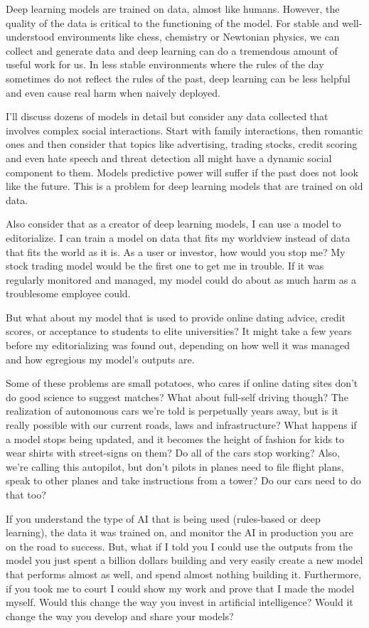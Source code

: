 Deep learning models are trained on data, almost like humans. However, the quality of the data is critical to the functioning of the model. For stable and well-understood environments like chess, chemistry or Newtonian physics, we can collect and generate data and deep learning can do a tremendous amount of useful work for us. In less stable environments where the rules of the day sometimes do not reflect the rules of the past, deep learning can be less helpful and even cause real harm when naively deployed. 

I'll discuss dozens of models in detail but consider any data collected that involves complex social interactions. Start with family interactions, then romantic ones and then consider that topics like advertising, trading stocks, credit scoring and even hate speech and threat detection all might have a dynamic social component to them. Models predictive power will suffer if the past does not look like the future. This is a problem for deep learning models that are trained on old data.

Also consider that as a creator of deep learning models, I can use a model to editorialize. I can train a model on data that fits my worldview instead of data that fits the world as it is. As a user or investor, how would you stop me? My stock trading model would be the first one to get me in trouble. If it was regularly monitored and managed, my model could do about as much harm as a troublesome employee could. 

But what about my model that is used to provide online dating advice, credit scores, or acceptance to students to elite universities? It might take a few years before my editorializing was found out, depending on how well it was managed and how egregious my model's outputs are.

Some of these problems are small potatoes, who cares if online dating sites don't do good science to suggest matches? What about full-self driving though? The realization of autonomous cars we're told is perpetually years away, but is it really possible with our current roads, laws and infrastructure? What happens if a model stops being updated, and it becomes the height of fashion for kids to wear shirts with street-signs on them? Do all of the cars stop working? Also, we're calling this autopilot, but don't pilots in planes need to file flight plans, speak to other planes and take instructions from a tower? Do our cars need to do that too? 

If you understand the type of AI that is being used (rules-based or deep learning), the data it was trained on, and monitor the AI in production you are on the road to success. But, what if I told you I could use the outputs from the model you just spent a billion dollars building and very easily create a new model that performs almost as well, and spend almost nothing building it. Furthermore, if you took me to court I could show my work and prove that I made the model myself. Would this change the way you invest in artificial intelligence? Would it change the way you develop and share your models?

